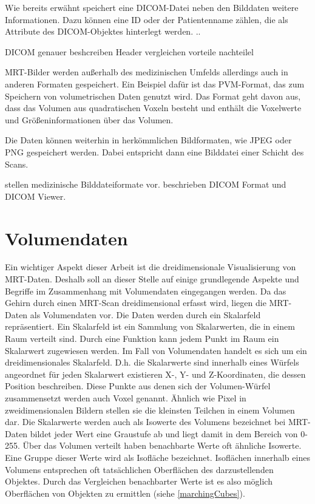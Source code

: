 Wie bereits erwähnt speichert eine DICOM-Datei neben den Bilddaten weitere Informationen. Dazu können eine ID oder der Patientenname zählen, die als Attribute des DICOM-Objektes hinterlegt werden. 
..

DICOM genauer beshcreiben
Header vergleichen
vorteile nachteilel

MRT-Bilder werden außerhalb des medizinischen Umfelds allerdings auch in anderen Formaten gespeichert. 
Ein Beispiel dafür ist das PVM-Format, das zum Speichern von volumetrischen Daten genutzt wird. Das Format geht davon aus, dass das Volumen aus quadratischen Voxeln besteht und enthält die Voxelwerte und Größeninformationen über das Volumen.

Die Daten können weiterhin in herkömmlichen Bildformaten, wie JPEG oder PNG gespeichert werden. Dabei entspricht dann eine Bilddatei einer Schicht des Scans. 
 
 \citet{Larobina13} stellen medizinische Bilddateiformate vor.
 \citet{graham05} beschrieben DICOM Format und DICOM Viewer.

\section{Volumendaten}							  	  %

Ein wichtiger Aspekt dieser Arbeit ist die dreidimensionale Visualisierung von MRT-Daten. Deshalb soll an dieser Stelle auf einige grundlegende Aspekte und Begriffe im Zusammenhang mit Volumendaten eingegangen werden. Da das Gehirn durch einen MRT-Scan dreidimensional erfasst wird, liegen die MRT-Daten als Volumendaten vor. Die Daten werden durch ein Skalarfeld repräsentiert. Ein Skalarfeld ist ein Sammlung von Skalarwerten, die in einem Raum verteilt sind. Durch eine Funktion kann jedem Punkt im Raum ein Skalarwert zugewiesen werden. Im Fall von Volumendaten handelt es sich um ein dreidimensionales Skalarfeld. D.h. die Skalarwerte sind innerhalb eines Würfels angeordnet für jeden Skalarwert existieren X-, Y- und Z-Koordinaten, die dessen Position beschreiben. 
Diese Punkte aus denen sich der Volumen-Würfel zusammensetzt werden auch Voxel genannt. Ähnlich wie Pixel in zweidimensionalen Bildern stellen sie die kleinsten Teilchen in einem Volumen dar. 
Die Skalarwerte werden auch als Isowerte des Volumens bezeichnet bei MRT-Daten bildet jeder Wert eine Graustufe ab und liegt damit in dem Bereich von 0-255. 
Über das Volumen verteilt haben benachbarte Werte oft ähnliche Isowerte. Eine Gruppe dieser Werte wird als Isofläche bezeichnet. Isoflächen innerhalb eines Volumens entsprechen oft tatsächlichen Oberflächen des darzustellenden Objektes. Durch das Vergleichen benachbarter Werte ist es also möglich Oberflächen von Objekten zu ermittlen (siehe \ref{marchingCubes}). 

